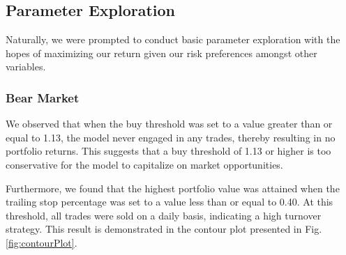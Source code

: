 \documentclass{article}
\begin{document}
\subsection{Parameter Exploration}
Naturally, we were prompted to conduct basic parameter exploration with the hopes of maximizing our return given our risk preferences amongst other variables.

\subsubsection{Bear Market}
We observed that when the buy threshold was set to a value greater than or equal to 1.13, the model never engaged in any trades, thereby resulting in no portfolio returns. This suggests that a buy threshold of 1.13 or higher is too conservative for the model to capitalize on market opportunities.

Furthermore, we found that the highest portfolio value was attained when the trailing stop percentage was set to a value less than or equal to 0.40. At this threshold, all trades were sold on a daily basis, indicating a high turnover strategy. This result is demonstrated in the contour plot presented in Fig. \ref{fig:contourPlot}.
\end{document}
